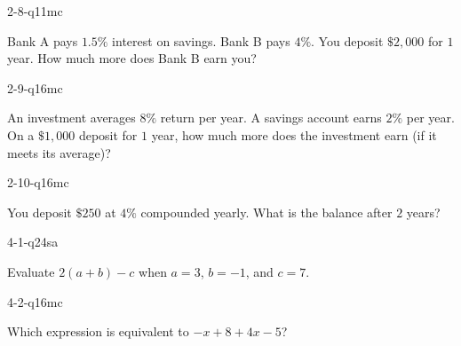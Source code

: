 \begin{practiceQuestion}{2-8-q11}{mc}
\begin{questionText}
Bank A pays $1.5\%$ interest on savings. Bank B pays $4\%$. You deposit $\$2{,}000$ for $1$ year. How much more does Bank B earn you?
\end{questionText}
\end{practiceQuestion}

\begin{practiceQuestion}{2-9-q16}{mc}
\begin{questionText}
An investment averages $8\%$ return per year. A savings account earns $2\%$ per year. On a $\$1{,}000$ deposit for $1$ year, how much more does the investment earn (if it meets its average)?
\end{questionText}
\end{practiceQuestion}

\begin{practiceQuestion}{2-10-q16}{mc}
\begin{questionText}
You deposit $\$250$ at $4\%$ compounded yearly. What is the balance after $2$ years?
\end{questionText}
\end{practiceQuestion}

\begin{practiceQuestion}{4-1-q24}{sa}
\begin{questionText}
Evaluate $2(a + b) - c$ when $a = 3$, $b = -1$, and $c = 7$.
\end{questionText}
\end{practiceQuestion}

\begin{practiceQuestion}{4-2-q16}{mc}
\begin{questionText}
Which expression is equivalent to $-x + 8 + 4x - 5$?
\end{questionText}
\end{practiceQuestion}

